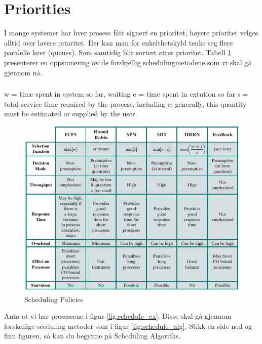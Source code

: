\newpage
\section{Priorities}
I mange systemer har hver prosess fått signert en prioritet, høyere prioritet velges alltid over lavere prioritet. Her kan man for enkelthetskyld tenke seg flere paralelle køer (queues). Som samtidig blir sortert etter prioritet.
Tabell \ref{fig:schedule_po} presenterer en oppsumering av de forskjellig schedulingmetodene som vi skal gå gjennom nå. 
\subsubsection{}
w = time spent in system so far, waiting\newline
e = time spent in extution so far\newline
s = total service time required by the process, including e; generally, this quantity must be estimated or supplied by the user.\newline\newline

\begin{figure}
\centering
\includegraphics{img/scheduling_policy.JPG}
\caption{Scheduling Policies}
\label{fig:schedule_po}
\end{figure}

Anta at vi har prosessene i figur \ref{fig:schedule_ex}. Disse skal gå gjennom forskellige sceduling metoder som i figur \ref{fig:schedule_alg}. Stikk en side ned og finn figuren, så kan du begynne på Scheduling Algoriths.

